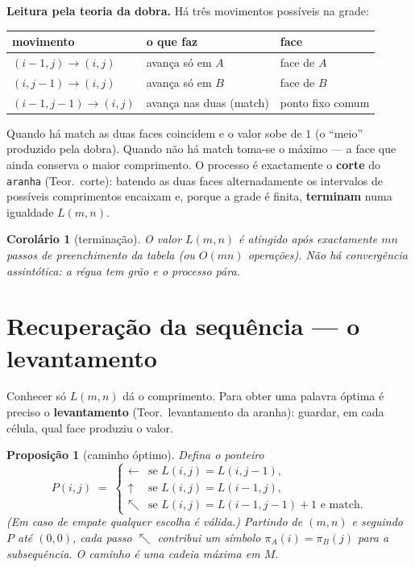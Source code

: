 \documentclass[11pt,a4paper]{article}
\newtheorem{corolario}[teorema]{Corolário}
\newtheorem{proposicao}[teorema]{Proposição}
\begin{document}
\medskip\noindent\textbf{Leitura pela teoria da dobra.}
Há três movimentos possíveis na grade:
\begin{center}
\begin{tabular}{@{}lll@{}}
\toprule
movimento & o que faz & face \\
\midrule
$(i-1,j)\to(i,j)$ & avança só em $A$ & face de $A$ \\
$(i,j-1)\to(i,j)$ & avança só em $B$ & face de $B$ \\
$(i-1,j-1)\to(i,j)$ & avança nas duas (match) & ponto fixo comum \\
\bottomrule
\end{tabular}
\end{center}
Quando há match as duas faces coincidem e o valor sobe de $1$
(o ``meio'' produzido pela dobra). Quando não há match toma-se o
máximo --- a face que ainda conserva o maior comprimento.
O processo é exactamente o \textbf{corte} do \texttt{aranha}
(Teor.~corte): batendo as duas faces alternadamente os intervalos
de possíveis comprimentos encaixam e, porque a grade é finita,
\textbf{terminam} numa igualdade $L(m,n)$.

\begin{corolario}[terminação]
O valor $L(m,n)$ é atingido após exactamente $mn$ passos de
preenchimento da tabela (ou $O(mn)$ operações). Não há convergência
assintótica: a régua tem grão e o processo pára.
\end{corolario}

\section{Recuperação da sequência --- o levantamento}

Conhecer só $L(m,n)$ dá o comprimento. Para obter uma palavra
óptima é preciso o \textbf{levantamento} (Teor.~levantamento da
aranha): guardar, em cada célula, qual face produziu o valor.

\begin{proposicao}[caminho óptimo]
Defina o ponteiro
\[
P(i,j)\;=\;
\begin{cases}
\leftarrow & \text{se }L(i,j)=L(i,j-1),\\
\uparrow   & \text{se }L(i,j)=L(i-1,j),\\
\nwarrow  & \text{se }L(i,j)=L(i-1,j-1)+1\text{ e match}.
\end{cases}
\]
(Em caso de empate qualquer escolha é válida.)
Partindo de $(m,n)$ e seguindo $P$ até $(0,0)$, cada passo
$\nwarrow$ contribui um símbolo $\pi_A(i)=\pi_B(j)$ para a
subsequência. O caminho é uma cadeia máxima em $M$.
\end{proposicao}
\end{document}
